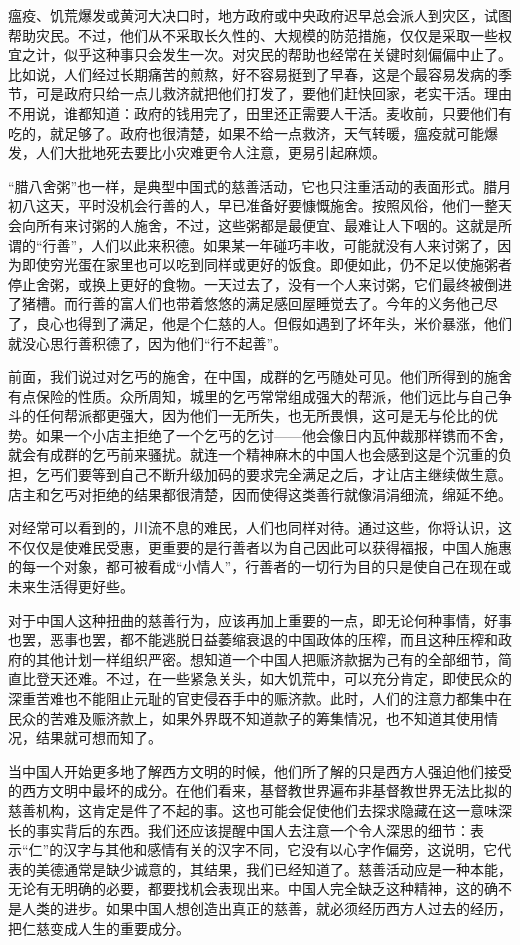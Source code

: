 \documentclass[12pt,oneside]{book}
\begin{document}
\begin{common-format}
瘟疫、饥荒爆发或黄河大决口时，地方政府或中央政府迟早总会派人到灾区，试图帮助灾民。不过，他们从不采取长久性的、大规模的防范措施，仅仅是采取一些权宜之计，似乎这种事只会发生一次。对灾民的帮助也经常在关键时刻偏偏中止了。比如说，人们经过长期痛苦的煎熬，好不容易挺到了早春，这是个最容易发病的季节，可是政府只给一点儿救济就把他们打发了，要他们赶快回家，老实干活。理由不用说，谁都知道：政府的钱用完了，田里还正需要人干活。麦收前，只要他们有吃的，就足够了。政府也很清楚，如果不给一点救济，天气转暖，瘟疫就可能爆发，人们大批地死去要比小灾难更令人注意，更易引起麻烦。 

“腊八舍粥”也一样，是典型中国式的慈善活动，它也只注重活动的表面形式。腊月初八这天，平时没机会行善的人，早已准备好要慷慨施舍。按照风俗，他们一整天会向所有来讨粥的人施舍，不过，这些粥都是最便宜、最难让人下咽的。这就是所谓的“行善”，人们以此来积德。如果某一年碰巧丰收，可能就没有人来讨粥了，因为即使穷光蛋在家里也可以吃到同样或更好的饭食。即便如此，仍不足以使施粥者停止舍粥，或换上更好的食物。一天过去了，没有一个人来讨粥，它们最终被倒进了猪槽。而行善的富人们也带着悠悠的满足感回屋睡觉去了。今年的义务他己尽了，良心也得到了满足，他是个仁慈的人。但假如遇到了坏年头，米价暴涨，他们就没心思行善积德了，因为他们“行不起善”。 

前面，我们说过对乞丐的施舍，在中国，成群的乞丐随处可见。他们所得到的施舍有点保险的性质。众所周知，城里的乞丐常常组成强大的帮派，他们远比与自己争斗的任何帮派都更强大，因为他们一无所失，也无所畏惧，这可是无与伦比的优势。如果一个小店主拒绝了一个乞丐的乞讨——他会像日内瓦仲裁那样镌而不舍，就会有成群的乞丐前来骚扰。就连一个精神麻木的中国人也会感到这是个沉重的负担，乞丐们要等到自己不断升级加码的要求完全满足之后，才让店主继续做生意。店主和乞丐对拒绝的结果都很清楚，因而使得这类善行就像涓涓细流，绵延不绝。 

对经常可以看到的，川流不息的难民，人们也同样对待。通过这些，你将认识，这不仅仅是使难民受惠，更重要的是行善者以为自己因此可以获得福报，中国人施惠的每一个对象，都可被看成“小情人”，行善者的一切行为目的只是使自己在现在或未来生活得更好些。 

对于中国人这种扭曲的慈善行为，应该再加上重要的一点，即无论何种事情，好事也罢，恶事也罢，都不能逃脱日益萎缩衰退的中国政体的压榨，而且这种压榨和政府的其他计划一样组织严密。想知道一个中国人把赈济款据为己有的全部细节，简直比登天还难。不过，在一些紧急关头，如大饥荒中，可以充分肯定，即使民众的深重苦难也不能阻止元耻的官吏侵吞手中的赈济款。此时，人们的注意力都集中在民众的苦难及赈济款上，如果外界既不知道款子的筹集情况，也不知道其使用情况，结果就可想而知了。 

当中国人开始更多地了解西方文明的时候，他们所了解的只是西方人强迫他们接受的西方文明中最坏的成分。在他们看来，基督教世界遍布非基督教世界无法比拟的慈善机构，这肯定是件了不起的事。这也可能会促使他们去探求隐藏在这一意味深长的事实背后的东西。我们还应该提醒中国人去注意一个令人深思的细节：表示“仁”的汉字与其他和感情有关的汉字不同，它没有以心字作偏旁，这说明，它代表的美德通常是缺少诚意的，其结果，我们已经知道了。慈善活动应是一种本能，无论有无明确的必要，都要找机会表现出来。中国人完全缺乏这种精神，这的确不是人类的进步。如果中国人想创造出真正的慈善，就必须经历西方人过去的经历，把仁慈变成人生的重要成分。 



\end{common-format}
\end{document}
